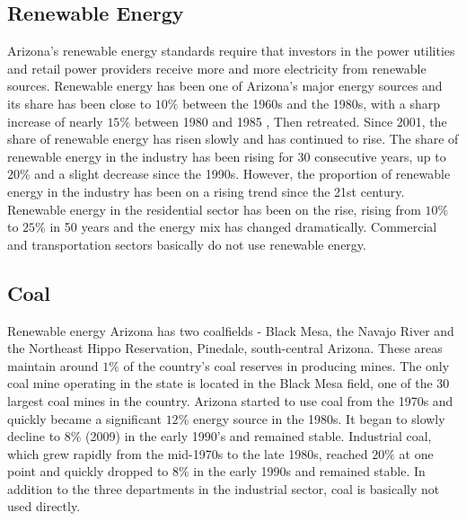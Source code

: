 \documentclass{mcmthesis}
\begin{document}
\subsection{Renewable Energy}
  Arizona's renewable energy standards require that investors in the power utilities and retail power providers receive more and more electricity
  from renewable sources. Renewable energy has been one of Arizona's major energy sources and its share has been close to $10\%$ between the 1960s
  and the 1980s, with a sharp increase of nearly $15\%$ between 1980 and 1985 , Then retreated. Since 2001, the share of renewable energy has risen
  slowly and has continued to rise. The share of renewable energy in the industry has been rising for 30 consecutive years, up to $20\%$ and
  a slight decrease since the 1990s. However, the proportion of renewable energy in the industry has been on a rising trend since the 21st century.
  Renewable energy in the residential sector has been on the rise, rising from $10\%$ to $25\%$ in 50 years and the energy mix has changed dramatically.
  Commercial and transportation sectors basically do not use renewable energy.
\subsection{Coal}
  Renewable energy Arizona has two coalfields - Black Mesa, the Navajo River and the Northeast Hippo Reservation, Pinedale, south-central Arizona.
  These areas maintain around $1\%$ of the country's coal reserves in producing mines. The only coal mine operating in the state is located in the Black
  Mesa field, one of the 30 largest coal mines in the country. Arizona started to use coal from the 1970s and quickly became a significant $12\%$ energy
  source in the 1980s. It began to slowly decline to $8\%$ (2009) in the early 1990's and remained stable. Industrial coal,
  which grew rapidly from the mid-1970s to the late 1980s, reached $20\%$ at one point and quickly dropped to $8\%$ in the early 1990s and remained stable.
  In addition to the three departments in the industrial sector, coal is basically not used directly.
\end{document}
